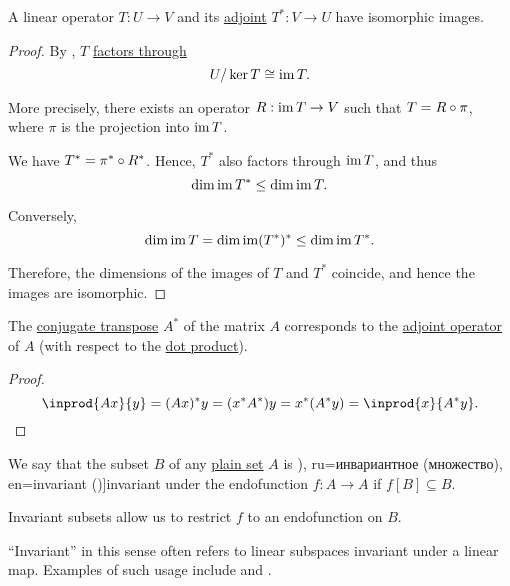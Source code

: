 \begin{proposition}\label{thm:image_of_adjoint}
  A linear operator \( T: U \to V \) and its \hyperref[def:adjoint_operator]{adjoint} \( T^*: V \to U \) have isomorphic images.
\end{proposition}
\begin{proof}
  By , \( T \) \hyperref[def:factors_through]{factors through}
  \begin{equation*}
    U / \ker T \cong \operatorname{im} T.
  \end{equation*}

  More precisely, there exists an operator \( R: \operatorname{im} T \to V \) such that \( T = R \bincirc \pi \), where \( \pi \) is the projection into \( \operatorname{im} T \).

  We have \( T^* = \pi^* \bincirc R^* \). Hence, \( T^* \) also factors through \( \operatorname{im} T \), and thus
  \begin{equation*}
    \dim \operatorname{im} T^* \leq \dim \operatorname{im} T.
  \end{equation*}

  Conversely,
  \begin{equation*}
    \dim \operatorname{im} T = \dim \operatorname{im} (T^*)^* \leq \dim \operatorname{im} T^*.
  \end{equation*}

  Therefore, the dimensions of the images of \( T \) and \( T^* \) coincide, and hence the images are isomorphic.
\end{proof}

\begin{proposition}\label{thm:conjugate_transpose}
  The \hyperref[def:conjugate_transpose]{conjugate transpose} \( A^* \) of the matrix \( A \) corresponds to the \hyperref[def:adjoint_operator]{adjoint operator} of \( A \) (with respect to the \hyperref[def:inner_product_space]{dot product}).
\end{proposition}
\begin{proof}
  \begin{equation*}
    \inprod {Ax} {y}
    =
    (Ax)^* y
    =
    (x^* A^*) y
    =
    x^* (A^* y)
    =
    \inprod {x} {A^* y}.
  \end{equation*}
\end{proof}

\begin{definition}\label{def:invariant_subset}
  We say that the subset \( B \) of any \hyperref[def:set]{plain set} \( A \) is \term[bg=инвариантно (подпространство) (\cite[def. X.1]{ГеновМиховскиМоллов1991Алгебра}), ru=инвариантное (множество), en=invariant (\cite[108]{DaveyPriestley2002LatticeTheory})]{invariant} under the endofunction \( f: A \to A \) if \( f[B] \subseteq B \).
\end{definition}
\begin{comments}
  \item Invariant subsets allow us to restrict \( f \) to an endofunction on \( B \).
  \item \enquote{Invariant} in this sense often refers to linear subspaces invariant under a linear map. Examples of such usage include  and .
\end{comments}

